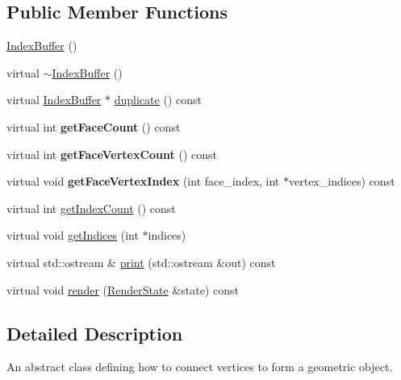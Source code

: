 \subsection*{Public Member Functions}
\begin{CompactItemize}
\item 
\hyperlink{classm3g_1_1IndexBuffer_d2e68a2d7c6c753d3abfeef42ee79427}{IndexBuffer} ()
\item 
virtual \hyperlink{classm3g_1_1IndexBuffer_ac7952364fe4d2d7b2731da5380c841c}{$\sim$IndexBuffer} ()
\item 
virtual \hyperlink{classm3g_1_1IndexBuffer}{IndexBuffer} $\ast$ \hyperlink{classm3g_1_1IndexBuffer_fab6fc0a0ec393e527f849c3af10ad76}{duplicate} () const 
\item 
\hypertarget{classm3g_1_1IndexBuffer_f4554e20b080880f27da67c539bb6748}{
virtual int \textbf{getFaceCount} () const }
\label{classm3g_1_1IndexBuffer_f4554e20b080880f27da67c539bb6748}

\item 
\hypertarget{classm3g_1_1IndexBuffer_007506f2b3f5563a65e4cfc1007d57ff}{
virtual int \textbf{getFaceVertexCount} () const }
\label{classm3g_1_1IndexBuffer_007506f2b3f5563a65e4cfc1007d57ff}

\item 
\hypertarget{classm3g_1_1IndexBuffer_d2721de0db09f6c65d9d4b088a269171}{
virtual void \textbf{getFaceVertexIndex} (int face\_\-index, int $\ast$vertex\_\-indices) const }
\label{classm3g_1_1IndexBuffer_d2721de0db09f6c65d9d4b088a269171}

\item 
virtual int \hyperlink{classm3g_1_1IndexBuffer_fe9ae2993ebcdb93d5ff26d57c81b73e}{getIndexCount} () const 
\item 
virtual void \hyperlink{classm3g_1_1IndexBuffer_650953afac45099025a524ab160b911f}{getIndices} (int $\ast$indices)
\item 
virtual std::ostream \& \hyperlink{classm3g_1_1IndexBuffer_6fea17fa1532df3794f8cb39cb4f911f}{print} (std::ostream \&out) const 
\item 
virtual void \hyperlink{classm3g_1_1IndexBuffer_8babc8a79b78615da51161e94029eea9}{render} (\hyperlink{structm3g_1_1RenderState}{RenderState} \&state) const 
\end{CompactItemize}


\subsection{Detailed Description}
An abstract class defining how to connect vertices to form a geometric object. 

